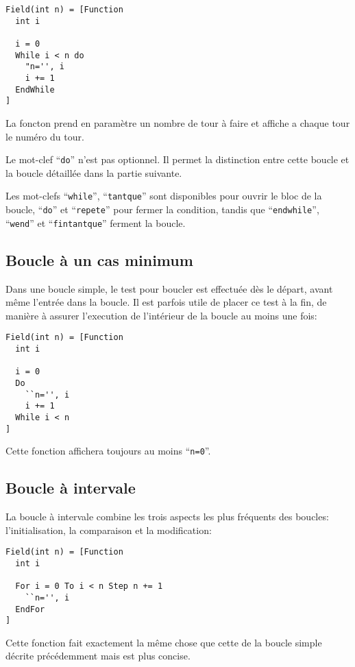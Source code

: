 \documentclass[a5paper, 12pt]{book}
\begin{document}
\begin{verbatim}
Field(int n) = [Function
  int i

  i = 0
  While i < n do
    "n='', i
    i += 1
  EndWhile
]
\end{verbatim}

La foncton prend en paramètre un nombre de tour à faire et
affiche a chaque tour le numéro du tour.

Le mot-clef ``\verb!do!'' n'est pas optionnel. Il permet
la distinction entre cette boucle et la boucle détaillée
dans la partie suivante.

Les mot-clefs ``\verb!while!'', ``\verb!tantque!'' sont disponibles
pour ouvrir le bloc de la boucle, ``\verb!do!'' et ``\verb!repete!'' pour
fermer la condition, tandis que ``\verb!endwhile!'',
``\verb!wend!'' et ``\verb!fintantque!'' ferment la boucle.

\subsection{Boucle à un cas minimum}

Dans une boucle simple, le test pour boucler est effectuée
dès le départ, avant même l'entrée dans la boucle.
Il est parfois utile de placer ce test à la fin, de manière
à assurer l'execution de l'intérieur de la boucle au moins
une fois:\\

\begin{verbatim}
Field(int n) = [Function
  int i

  i = 0
  Do
    ``n='', i
    i += 1
  While i < n
]
\end{verbatim}

Cette fonction affichera toujours au moins ``\verb!n=0!''.

\subsection{Boucle à intervale}

La boucle à intervale combine les trois aspects
les plus fréquents des boucles: l'initialisation,
la comparaison et la modification:\\

\begin{verbatim}
Field(int n) = [Function
  int i

  For i = 0 To i < n Step n += 1
    ``n='', i
  EndFor
]
\end{verbatim}

Cette fonction fait exactement la même chose que cette
de la boucle simple décrite précédemment mais est plus
concise.
\end{document}
